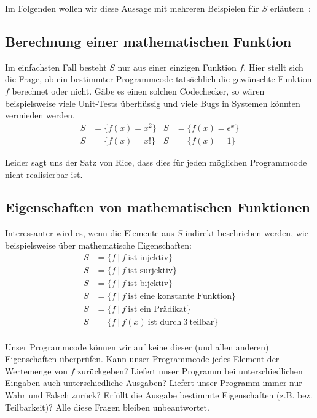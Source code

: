 \documentclass[journal]{IEEEtran}
\begin{document}
Im Folgenden wollen wir diese Aussage mit mehreren Beispielen für $S$ erläutern~\cite{weiterebeispiele}:

\subsection{Berechnung einer mathematischen Funktion}

Im einfachsten Fall besteht $S$ nur aus einer einzigen Funktion $f$. Hier stellt sich die Frage, ob ein bestimmter Programmcode tatsächlich die gewünschte Funktion $f$ berechnet oder nicht. Gäbe es einen solchen Codechecker, so wären beispielsweise viele Unit-Tests überflüssig und viele Bugs in Systemen könnten vermieden werden.
\begin{align*}
S &= \{f(x) = x^2 \} &S &= \{ f(x) = e^x \} \\
S &= \{f(x) = x! \}  &S &= \{ f(x) = 1 \}
\end{align*}

Leider sagt uns der Satz von Rice, dass dies für jeden möglichen Programmcode nicht realisierbar ist.

\subsection{Eigenschaften von mathematischen Funktionen}

Interessanter wird es, wenn die Elemente aus $S$ indirekt beschrieben werden, wie beispielsweise über mathematische Eigenschaften:
\begin{align*}
S &= \{ f \ \vert \ f \ \text{ist injektiv} \} \\
S &= \{ f \ \vert \ f \ \text{ist surjektiv} \} \\
S &= \{ f \ \vert \ f \ \text{ist bijektiv} \} \\
S &= \{ f \ \vert \ f \ \text{ist eine konstante Funktion} \} \\
S &= \{ f \ \vert \ f \ \text{ist ein Prädikat} \} \\
S &= \{ f \ \vert \ f(x) \ \text{ist durch} \ 3 \ \text{teilbar} \} \\
\end{align*}

Unser Programmcode können wir auf keine dieser (und allen anderen) Eigenschaften überprüfen. Kann unser Programmcode jedes Element der Wertemenge von $f$ zurückgeben? Liefert unser Programm bei unterschiedlichen Eingaben auch unterschiedliche Ausgaben? Liefert unser Programm immer nur Wahr und Falsch zurück? Erfüllt die Ausgabe bestimmte Eigenschaften (z.B. bez. Teilbarkeit)? Alle diese Fragen bleiben unbeantwortet.
\end{document}
